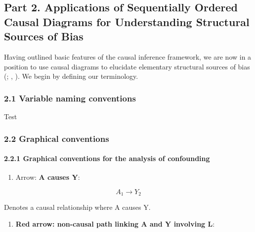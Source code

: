\documentclass[
  singlecolumn]{article}
\let\oldparagraph\paragraph
\renewcommand{\paragraph}[1]{\oldparagraph{#1}\mbox{}}
\providecommand{\tightlist}{%
  \setlength{\itemsep}{0pt}\setlength{\parskip}{0pt}}\usepackage{longtable,booktabs,array}
\begin{document}
\subsection{Part 2. Applications of Sequentially Ordered Causal Diagrams
for Understanding Structural Sources of
Bias}\label{part-2.-applications-of-sequentially-ordered-causal-diagrams-for-understanding-structural-sources-of-bias}

Having outlined basic features of the causal inference framework, we are
now in a position to use causal diagrams to elucidate elementary
structural sources of bias (; ,
). We begin by defining our terminology.

\subsubsection{2.1 Variable naming
conventions}\label{variable-naming-conventions}

\begin{table}

\caption{\label{tbl-00}Test}

\centering{

\terminologydirectedgraph 

}

\end{table}%

\subsubsection{2.2 Graphical conventions}\label{graphical-conventions}

\paragraph{2.2.1 Graphical conventions for the analysis of
confounding}\label{graphical-conventions-for-the-analysis-of-confounding}

\begin{enumerate}
\def\labelenumi{\arabic{enumi}.}
\tightlist
\item
  Arrow: \textbf{A causes Y}:
\end{enumerate}

\[A_1 \rightarrow Y_2\]

Denotes a causal relationship where A causes Y.

\begin{enumerate}
\def\labelenumi{\arabic{enumi}.}
\setcounter{enumi}{1}
\tightlist
\item
  \textbf{Red arrow: non-causal path linking A and Y involving L}:
\end{enumerate}
\end{document}
